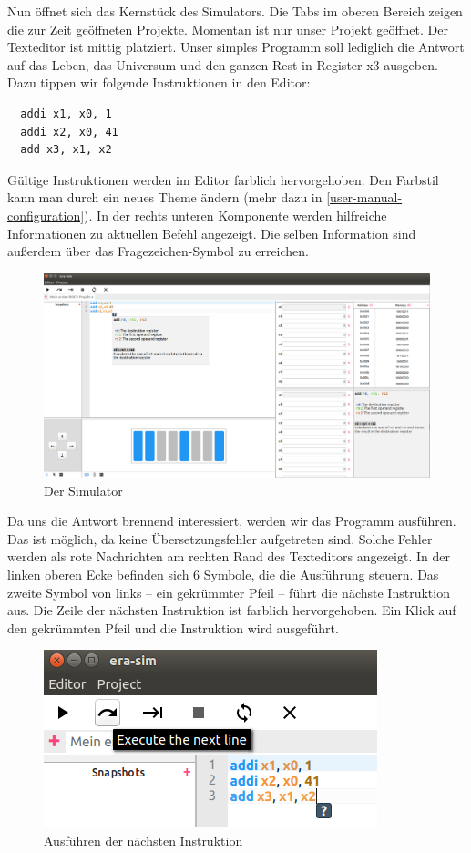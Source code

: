 Nun öffnet sich das Kernstück des Simulators. Die Tabs im oberen Bereich zeigen die zur Zeit geöffneten Projekte. Momentan ist nur unser Projekt geöffnet. Der Texteditor ist mittig platziert. Unser simples Programm soll lediglich die Antwort auf das Leben, das Universum und den ganzen Rest in Register x3 ausgeben. Dazu tippen wir folgende Instruktionen in den Editor:
\begin{lstlisting}
  addi x1, x0, 1
  addi x2, x0, 41
  add x3, x1, x2
\end{lstlisting}
Gültige Instruktionen werden im Editor farblich hervorgehoben. Den Farbstil kann man durch ein neues Theme ändern (mehr dazu in \autoref{user-manual-configuration}). In der rechts unteren Komponente werden hilfreiche Informationen zu aktuellen Befehl angezeigt. Die selben Information sind außerdem über das Fragezeichen-Symbol zu erreichen.
\begin{figure}[H]
	\centering
	\includegraphics[scale=0.4]{Images/first-steps-2.png}
	\caption{Der Simulator}
\end{figure}

Da uns die Antwort brennend interessiert, werden wir das Programm ausführen. Das ist möglich, da keine Übersetzungsfehler aufgetreten sind. Solche Fehler werden als rote Nachrichten am rechten Rand des Texteditors angezeigt. In der linken oberen Ecke befinden sich 6 Symbole, die die Ausführung steuern. Das zweite Symbol von links -- ein gekrümmter Pfeil -- führt die nächste Instruktion aus. Die Zeile der nächsten Instruktion ist farblich hervorgehoben. Ein Klick auf den gekrümmten Pfeil und die Instruktion wird ausgeführt.
\begin{figure}[H]
	\centering
	\includegraphics[scale=1.0]{Images/first-steps-3.png}
	\caption{Ausführen der nächsten Instruktion}
\end{figure}

